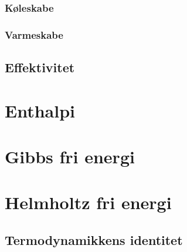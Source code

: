 \documentclass[crop=false, class=memoir]{standalone}
\begin{document}
\subsubsection{Køleskabe}
\subsubsection{Varmeskabe}

\subsection{Effektivitet}\label{termo:sec:effect}


\section{Enthalpi}
\section{Gibbs fri energi}
\section{Helmholtz fri energi}
\subsection{Termodynamikkens identitet}
\end{document}
